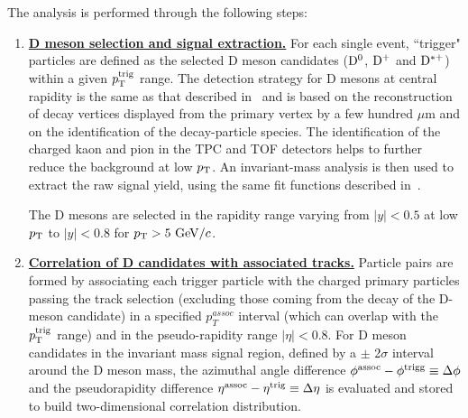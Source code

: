 The analysis is performed through the following steps:
\begin{enumerate}

\item
\underline {\bf D meson selection and signal extraction.}  For each single event, ``trigger" particles
are defined as the selected  D meson candidates (${\rm D^0}$, ${\rm D^+}$ and ${\rm D^{*+}}$)
within a given $p_{\rm T}^{\rm trig}$ range. The detection strategy for D mesons at central rapidity is
the same as that described in~\cite{ALICEDmespp7Tev} and is based on the reconstruction of decay
vertices displayed from the primary vertex by a few hundred $\mu$m and on the identification of the decay-particle species.
The identification of the charged kaon and pion in the TPC and TOF
detectors helps to further reduce the background at low $p_{\rm T}$.  An
invariant-mass analysis is then used to extract the raw signal yield, using
the same fit functions described in~\cite{ALICEDmespp7Tev}.


The D mesons are selected in the rapidity range varying from $|y|<0.5$ at low $p_{\rm T}$ to $|y|<0.8$ for $p_{\rm T}>5~\mathrm{GeV}/c$. %

\item
\underline {\bf Correlation of D candidates with associated tracks.}
Particle pairs are formed by associating each trigger particle with
the charged primary particles passing the track selection (excluding those coming from the decay of the D-meson candidate) in a specified $p^{assoc}_{T}$
interval (which can overlap with the $p_{\rm T}^{\rm trig}$ range) and in the pseudo-rapidity range $|\eta|<0.8$. For D meson candidates
in the invariant mass signal region, defined by a $\pm$ 2$\sigma$ interval around the D meson mass, the azimuthal angle difference $\phi^{\rm assoc}-\phi^{\rm trigg}\equiv\Delta\phi$
and the pseudorapidity difference $\eta^{\rm assoc}-\eta^{\rm trig}\equiv\Delta \eta$ is evaluated and stored to build two-dimensional correlation distribution. %


\end{enumerate}
